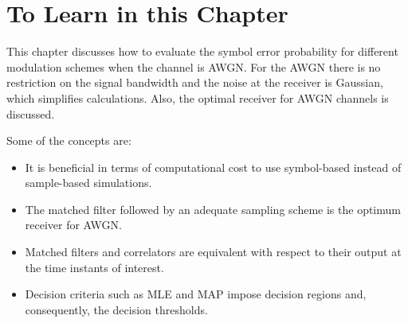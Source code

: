 \section{To Learn in this Chapter}

This chapter discusses how to evaluate the symbol error probability for different modulation schemes when the channel is AWGN. For the AWGN there is no restriction on the signal bandwidth and the noise at the receiver is Gaussian, which simplifies calculations. Also, the optimal receiver for AWGN channels is discussed. 

Some of the concepts are:
\begin{itemize}
\item It is beneficial in terms of computational cost to use symbol-based instead of sample-based simulations.
\item The matched filter followed by an adequate sampling scheme is the optimum receiver for AWGN.
\item Matched filters and correlators are equivalent with respect to their output at the time instants of interest.
\item Decision criteria such as MLE and MAP impose decision regions and, consequently, the decision thresholds.
\end{itemize}





